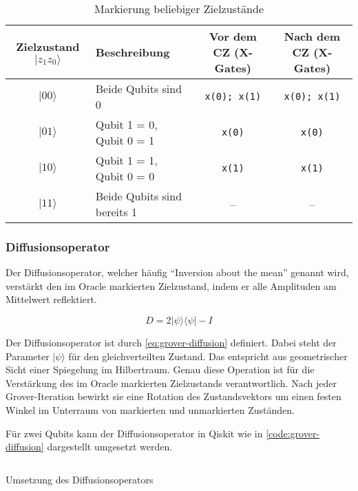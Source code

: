 \begin{table}[ht!]
\centering
\begin{tabularx}{\textwidth}{|c|X|c|c|}
\hline
\textbf{Zielzustand $|z_1 z_0\rangle$} & \textbf{Beschreibung} & \textbf{Vor dem CZ (X-Gates)} & \textbf{Nach dem CZ (X-Gates)} \\
\hline
$|00\rangle$ & Beide Qubits sind 0 & \texttt{x(0); x(1)} & \texttt{x(0); x(1)} \\
\hline
$|01\rangle$ & Qubit 1 = 0, Qubit 0 = 1 & \texttt{x(0)} & \texttt{x(0)} \\
\hline
$|10\rangle$ & Qubit 1 = 1, Qubit 0 = 0 & \texttt{x(1)} & \texttt{x(1)} \\
\hline
$|11\rangle$ & Beide Qubits sind bereits 1 & – & – \\
\hline
\end{tabularx}
\caption{Markierung beliebiger Zielzustände}
\label{tab:cz-xgates}
\end{table}

\subsubsection*{Diffusionsoperator}

Der Diffusionsoperator, welcher häufig \enquote{Inversion about the mean} genannt wird, verstärkt den im Oracle markierten Zielzustand, indem er alle Amplituden am Mittelwert reflektiert.

\begin{equation}
\label{eq:grover-diffusion}
D = 2|\psi\rangle\langle\psi| - I
\end{equation}

Der Diffusionsoperator ist durch \autoref{eq:grover-diffusion} definiert. Dabei steht der Parameter $|\psi\rangle$ für den gleichverteilten Zustand. Das entspricht aus geometrischer Sicht einer Spiegelung im Hilbertraum. Genau diese Operation ist für die Verstärkung des im Oracle markierten Zielzustands verantwortlich. Nach jeder Grover-Iteration bewirkt sie eine Rotation des Zustandsvektors um einen festen Winkel im Unterraum von markierten und unmarkierten Zuständen. \autocite{nielsen_quantum_2010}

Für zwei Qubits kann der Diffusionsoperator in Qiskit wie in \autoref{code:grover-diffusion} dargestellt umgesetzt werden.

\begin{listing}[ht!]
  \inputminted{python}{code/quantum-software/grover-diffusion.py}
  \caption{Umsetzung des Diffusionsoperators}
  \label{code:grover-diffusion}
\end{listing}

